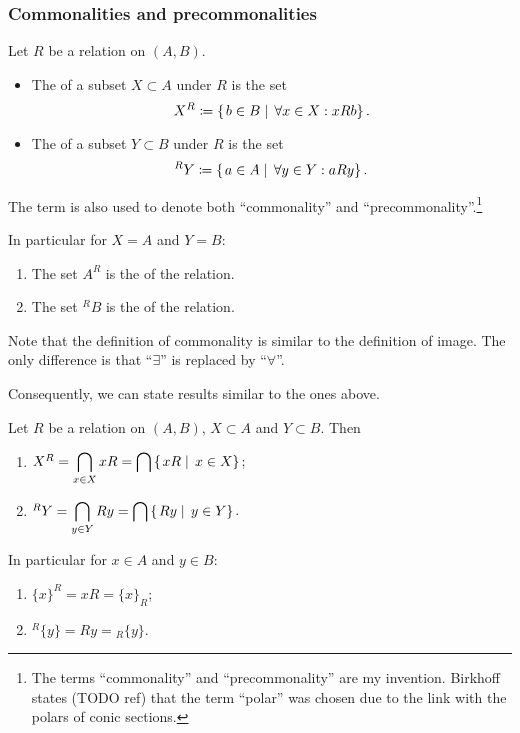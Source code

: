 \subsubsection{Commonalities and precommonalities}
\begin{definition}
Let $R$ be a relation on $(A, B)$.
\begin{itemize}
\item The  of a subset $X\subset A$ under $R$ is the set
\[ X^R \coloneqq \left\{\left. b\in B \;\right|\; \forall x\in X: xRb \right\}. \]
\item The  of a subset $Y\subset B$ under $R$ is the set
\[ ^RY \coloneqq \left\{\left. a\in A \;\right|\; \forall y\in Y: aRy \right\}. \]
\end{itemize}
The term  is also used to denote both ``commonality'' and ``precommonality''.\footnote{The terms ``commonality'' and ``precommonality'' are my invention. Birkhoff states (TODO ref) that the term ``polar'' was chosen due to the link with the polars of conic sections.}

In particular for $X=A$ and $Y=B$:
\begin{enumerate}
\item The set $A^R$ is the  of the relation.
\item The set $^RB$ is the  of the relation.
\end{enumerate}
\end{definition}
Note that the definition of commonality is similar to the definition of image. The only difference is that ``$\exists$'' is replaced by ``$\forall$''.

Consequently, we can state results similar to the ones above.

\begin{lemma}
Let $R$ be a relation on $(A, B)$, $X\subset A$ and $Y\subset B$. Then
\begin{enumerate}
\item $X^R = \displaystyle\bigcap_{x\in X}xR = \bigcap \left\{\left. xR \;\right|\; x\in X \right\}$;
\item $^RY = \displaystyle\bigcap_{y\in Y}Ry = \bigcap \left\{\left. Ry \;\right|\; y\in Y \right\}$.
\end{enumerate}
In particular for $x\in A$ and $y\in B$:
\begin{enumerate}
\item $\{x\}^R = xR = \{x\}_R$;
\item $^R\{y\} = Ry = {_R\{y\}}$.
\end{enumerate}
\end{lemma}

